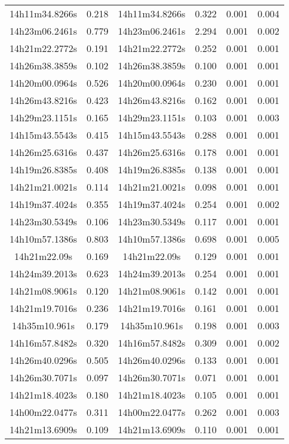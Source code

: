 \begin{table}
\begin{tabular}{cccccc}
14h11m34.8266s & 0.218 & 14h11m34.8266s & 0.322 & 0.001 & 0.004 \\
14h23m06.2461s & 0.779 & 14h23m06.2461s & 2.294 & 0.001 & 0.002 \\
14h21m22.2772s & 0.191 & 14h21m22.2772s & 0.252 & 0.001 & 0.001 \\
14h26m38.3859s & 0.102 & 14h26m38.3859s & 0.100 & 0.001 & 0.001 \\
14h20m00.0964s & 0.526 & 14h20m00.0964s & 0.230 & 0.001 & 0.001 \\
14h26m43.8216s & 0.423 & 14h26m43.8216s & 0.162 & 0.001 & 0.001 \\
14h29m23.1151s & 0.165 & 14h29m23.1151s & 0.103 & 0.001 & 0.003 \\
14h15m43.5543s & 0.415 & 14h15m43.5543s & 0.288 & 0.001 & 0.001 \\
14h26m25.6316s & 0.437 & 14h26m25.6316s & 0.178 & 0.001 & 0.001 \\
14h19m26.8385s & 0.408 & 14h19m26.8385s & 0.138 & 0.001 & 0.001 \\
14h21m21.0021s & 0.114 & 14h21m21.0021s & 0.098 & 0.001 & 0.001 \\
14h19m37.4024s & 0.355 & 14h19m37.4024s & 0.254 & 0.001 & 0.002 \\
14h23m30.5349s & 0.106 & 14h23m30.5349s & 0.117 & 0.001 & 0.001 \\
14h10m57.1386s & 0.803 & 14h10m57.1386s & 0.698 & 0.001 & 0.005 \\
14h21m22.09s & 0.169 & 14h21m22.09s & 0.129 & 0.001 & 0.001 \\
14h24m39.2013s & 0.623 & 14h24m39.2013s & 0.254 & 0.001 & 0.001 \\
14h21m08.9061s & 0.120 & 14h21m08.9061s & 0.142 & 0.001 & 0.001 \\
14h21m19.7016s & 0.236 & 14h21m19.7016s & 0.161 & 0.001 & 0.001 \\
14h35m10.961s & 0.179 & 14h35m10.961s & 0.198 & 0.001 & 0.003 \\
14h16m57.8482s & 0.320 & 14h16m57.8482s & 0.309 & 0.001 & 0.002 \\
14h26m40.0296s & 0.505 & 14h26m40.0296s & 0.133 & 0.001 & 0.001 \\
14h26m30.7071s & 0.097 & 14h26m30.7071s & 0.071 & 0.001 & 0.001 \\
14h21m18.4023s & 0.180 & 14h21m18.4023s & 0.105 & 0.001 & 0.001 \\
14h00m22.0477s & 0.311 & 14h00m22.0477s & 0.262 & 0.001 & 0.003 \\
14h21m13.6909s & 0.109 & 14h21m13.6909s & 0.110 & 0.001 & 0.001 \\

\end{tabular}
\end{table}
